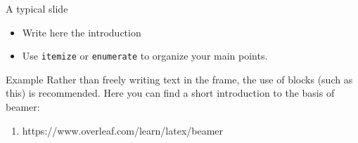 \documentclass[aspectratio=169]{beamer}
\begin{document}
	\begin{frame}{A typical slide}
		
		
		\begin{itemize}
			\item Write here the introduction
			\item Use \texttt{itemize} or \texttt{enumerate} to organize your main points.
		\end{itemize}
				
		\begin{block}{Example}
			Rather than freely writing text in the frame, the use of blocks (such as this) is recommended.
			Here you can find a short introduction to the basis of beamer:
			\begin{enumerate}
				\item https://www.overleaf.com/learn/latex/beamer
			\end{enumerate}
		\end{block}
		
	\end{frame}	
	
\end{document}
